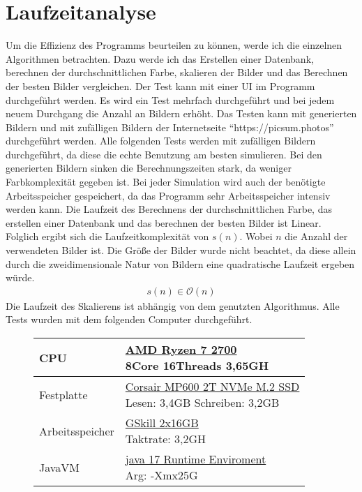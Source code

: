 \section{Laufzeitanalyse}
Um die Effizienz des Programms beurteilen zu können, werde ich die einzelnen Algorithmen betrachten. Dazu werde ich das Erstellen einer Datenbank, berechnen der durchschnittlichen Farbe, skalieren der Bilder und das Berechnen der besten Bilder vergleichen. Der Test kann mit einer UI im Programm durchgeführt werden. Es wird ein Test mehrfach durchgeführt und bei jedem neuem Durchgang die Anzahl an Bildern erhöht. Das Testen kann mit generierten Bildern und mit zufälligen Bildern der Internetseite ``https://picsum.photos'' durchgeführt werden. Alle folgenden Tests werden mit zufälligen Bildern durchgeführt, da diese die echte Benutzung am besten simulieren. Bei den generierten Bildern sinken die Berechnungszeiten stark, da weniger Farbkomplexität gegeben ist. Bei jeder Simulation wird auch der benötigte Arbeitsspeicher gespeichert, da das Programm sehr Arbeitsspeicher intensiv werden kann. Die Laufzeit des Berechnens der durchschnittlichen Farbe, das erstellen einer Datenbank und das berechnen der besten Bilder ist Linear. Folglich ergibt sich die Laufzeitkomplexität von $s(n)$. Wobei $n$ die Anzahl der verwendeten Bilder ist. Die Größe der Bilder wurde nicht beachtet, da diese allein durch die zweidimensionale Natur von Bildern eine quadratische Laufzeit ergeben würde.
\begin{align}
    s(n) \in \mathcal{O}(n)
\end{align}
Die Laufzeit des Skalierens ist abhängig von dem genutzten Algorithmus.
\bigskip
\newline
Alle Tests wurden mit dem folgenden Computer durchgeführt.
\begin{figure}[h]
    \centering
    \begin{tabular}{| l | l |}
        \hline
        CPU             & \makecell[l]{\underline{AMD Ryzen 7 2700} \\ 8Core 16Threads 3,65GH}\\
        \hline
        Festplatte      & \makecell[l]{\underline{Corsair MP600 2T NVMe M.2 SSD} \\ Lesen: 3,4GB Schreiben: 3,2GB}\\
        \hline
        Arbeitsspeicher & \makecell[l]{\underline{GSkill 2x16GB} \\ Taktrate: 3,2GH}\\
        \hline
        JavaVM          & \makecell[l]{\underline{java 17 Runtime Enviroment} \\ Arg: -Xmx25G}\\
        \hline
    \end{tabular}
\end{figure}

